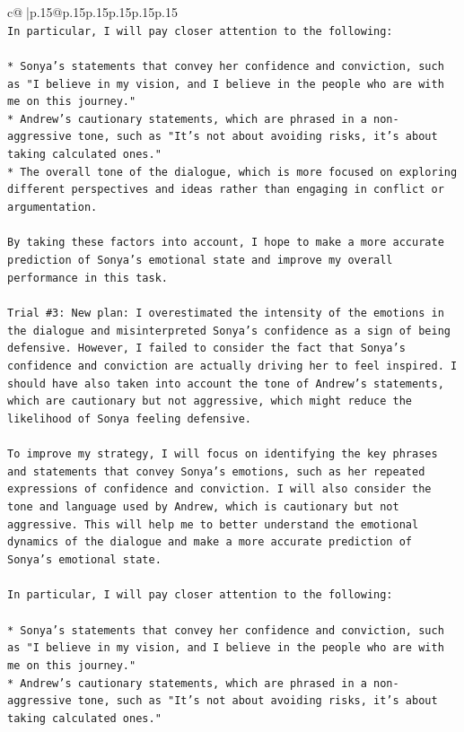 \documentclass{article}
\begin{document}
{\begin{supertabular}{c@{$\;$}|p{.15\linewidth}@{}p{.15\linewidth}p{.15\linewidth}p{.15\linewidth}p{.15\linewidth}p{.15\linewidth}}
{{{\\ 
\texttt{In particular, I will pay closer attention to the following:} \\
\\ 
\texttt{* Sonya's statements that convey her confidence and conviction, such as "I believe in my vision, and I believe in the people who are with me on this journey."} \\
\texttt{* Andrew's cautionary statements, which are phrased in a non{-}aggressive tone, such as "It's not about avoiding risks, it's about taking calculated ones."} \\
\texttt{* The overall tone of the dialogue, which is more focused on exploring different perspectives and ideas rather than engaging in conflict or argumentation.} \\
\\ 
\texttt{By taking these factors into account, I hope to make a more accurate prediction of Sonya's emotional state and improve my overall performance in this task.} \\
\\ 
\texttt{Trial \#3: New plan: I overestimated the intensity of the emotions in the dialogue and misinterpreted Sonya's confidence as a sign of being defensive. However, I failed to consider the fact that Sonya's confidence and conviction are actually driving her to feel inspired. I should have also taken into account the tone of Andrew's statements, which are cautionary but not aggressive, which might reduce the likelihood of Sonya feeling defensive.} \\
\\ 
\texttt{To improve my strategy, I will focus on identifying the key phrases and statements that convey Sonya's emotions, such as her repeated expressions of confidence and conviction. I will also consider the tone and language used by Andrew, which is cautionary but not aggressive. This will help me to better understand the emotional dynamics of the dialogue and make a more accurate prediction of Sonya's emotional state.} \\
\\ 
\texttt{In particular, I will pay closer attention to the following:} \\
\\ 
\texttt{* Sonya's statements that convey her confidence and conviction, such as "I believe in my vision, and I believe in the people who are with me on this journey."} \\
\texttt{* Andrew's cautionary statements, which are phrased in a non{-}aggressive tone, such as "It's not about avoiding risks, it's about taking calculated ones."} \\
}}}
\end{supertabular}}
\end{document}
